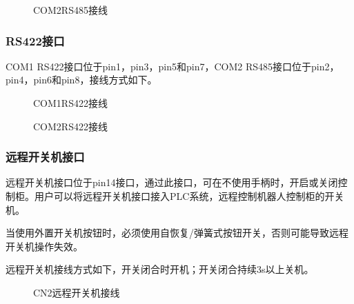 \documentclass[a4paper,11pt,english,openany,oneside]{sphinxmanual}
\begin{document}
\begin{figure}[H]
\centering
\capstart

\noindent{}
\caption{COM2\sphinxhyphen{}RS485接线}\label{\detokenize{08 _u5b89_u88c5_u4e0e_u8c03_u8bd5:id132}}\end{figure}




\subsubsection{RS422接口}
\label{\detokenize{08 _u5b89_u88c5_u4e0e_u8c03_u8bd5:rs422}}
\sphinxAtStartPar
COM1 RS422接口位于pin1，pin3，pin5和pin7，COM2 RS485接口位于pin2，pin4，pin6和pin8，接线方式如下。

\begin{figure}[H]
\centering
\capstart

\noindent{}
\caption{COM1\sphinxhyphen{}RS422接线}\label{\detokenize{08 _u5b89_u88c5_u4e0e_u8c03_u8bd5:id133}}\end{figure}



\begin{figure}[H]
\centering
\capstart

\noindent{}
\caption{COM2\sphinxhyphen{}RS422接线}\label{\detokenize{08 _u5b89_u88c5_u4e0e_u8c03_u8bd5:id134}}\end{figure}




\subsubsection{远程开关机接口}
\label{\detokenize{08 _u5b89_u88c5_u4e0e_u8c03_u8bd5:id78}}
\sphinxAtStartPar
远程开关机接口位于pin14接口，通过此接口，可在不使用手柄时，开启或关闭控制柜。用户可以将远程开关机接口接入PLC系统，远程控制机器人控制柜的开关机。

\sphinxAtStartPar
当使用外置开关机按钮时，必须使用自恢复/弹簧式按钮开关，否则可能导致远程开关机操作失效。

\sphinxAtStartPar
远程开关机接线方式如下，开关闭合时开机；开关闭合持续3s以上关机。

\begin{figure}[H]
\centering
\capstart

\noindent{}
\caption{CN2远程开关机接线}\label{\detokenize{08 _u5b89_u88c5_u4e0e_u8c03_u8bd5:id135}}\end{figure}
\end{document}
